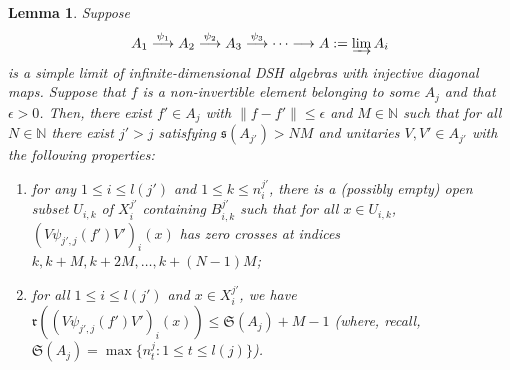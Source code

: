 \documentclass[12pt]{amsart}
\numberwithin{equation}{section}
\newtheorem{lemma}[theorem]{Lemma}
\theoremstyle{definition}
\theoremstyle{remark}
\newcommand{\NN}{\mathbb{N}}
\begin{document}
\begin{lemma}
	\label{far out}
	Suppose 
	$$
	A_{1}\overset{\psi_{1}}{\longrightarrow} A_{2}\overset{\psi_{2}}{\longrightarrow} A_{3}\overset{\psi_{3}}{\longrightarrow}\cdots\longrightarrow A:=\varinjlim A_{i}
	$$
	is a simple limit of infinite-dimensional DSH algebras with injective diagonal maps. Suppose that $f$ is a non-invertible element belonging to some $A_{j}$ and that $\epsilon > 0$. Then, there exist $f'\in A_{j}$ with $\|f-f'\|\leq \epsilon$ and $M\in\NN$ such that for all $N\in\NN$ there exist $j'>j$ satisfying $\mathfrak{s}(A_{j'})>NM$ and unitaries $V,V'\in A_{j'}$ with the following properties:
	\begin{enumerate}
		\item for any $1\leq i\leq  l (j')$ and $1\leq k\leq n_{i}^{j'}$, there is a (possibly empty) open subset $U_{i,k}$ of $X^{j'}_{i}$ containing $B_{i,k}^{j'}$ such that for all $x\in U_{i,k}$, $(V\psi_{j',j}(f')V')_{i}(x)$ has zero crosses at indices $k, k+M, k+2M,\ldots,k+(N-1)M$;
		\item for all $1\leq i\leq l (j')$ and $x\in X^{j'}_{i}$, we have $\mathfrak{r}((V\psi_{j',j}(f')V')_{i}(x))\leq \mathfrak{S}(A_{j})+M-1$ (where, recall, $\mathfrak{S}(A_{j})=\max\{n^{j}_{t}:1\leq t\leq l (j)\}$). 
	\end{enumerate}
\end{lemma}
\end{document}
